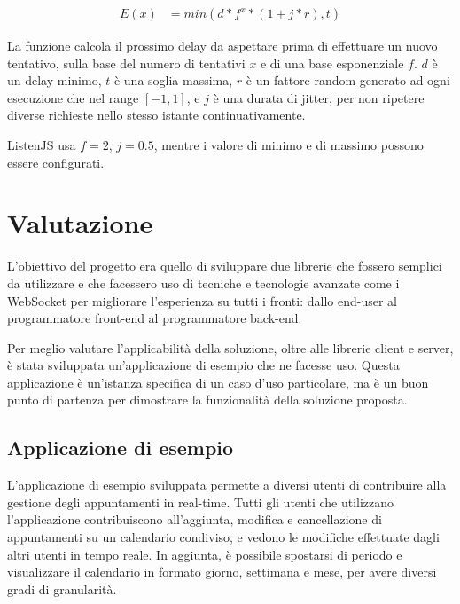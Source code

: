 \documentclass[12pt,a4paper,openright,twoside]{report}
\begin{document}
\begin{align*}
  E(x) &= min(d * f^x * (1 + j * r), t)
\end{align*}

La funzione calcola il prossimo delay da aspettare prima di effettuare un nuovo tentativo, sulla base del numero di tentativi $x$ e di una base esponenziale $f$. $d$ è un delay minimo, $t$ è una soglia massima, $r$ è un fattore random generato ad ogni esecuzione che nel range $[-1, 1]$, e $j$ è una durata di jitter, per non ripetere diverse richieste nello stesso istante continuativamente.

ListenJS usa $f=2$, $j=0.5$, mentre i valore di minimo e di massimo possono essere configurati.

\chapter{Valutazione}
L'obiettivo del progetto era quello di sviluppare due librerie che fossero semplici da utilizzare e che facessero uso di tecniche e tecnologie avanzate come i WebSocket per migliorare l'esperienza su tutti i fronti: dallo end-user al programmatore front-end al programmatore back-end.

\bigskip

Per meglio valutare l'applicabilità della soluzione, oltre alle librerie client e server, è stata sviluppata un'applicazione di esempio che ne facesse uso. Questa applicazione è un'istanza specifica di un caso d'uso particolare, ma è un buon punto di partenza per dimostrare la funzionalità della soluzione proposta.

\section{Applicazione di esempio}\label{sec_applicazioneesempio}
L'applicazione di esempio sviluppata permette a diversi utenti di contribuire alla gestione degli appuntamenti in real-time. Tutti gli utenti che utilizzano l'applicazione contribuiscono all'aggiunta, modifica e cancellazione di appuntamenti su un calendario condiviso, e vedono le modifiche effettuate dagli altri utenti in tempo reale. In aggiunta, è possibile spostarsi di periodo e visualizzare il calendario in formato giorno, settimana e mese, per avere diversi gradi di granularità.
\end{document}

